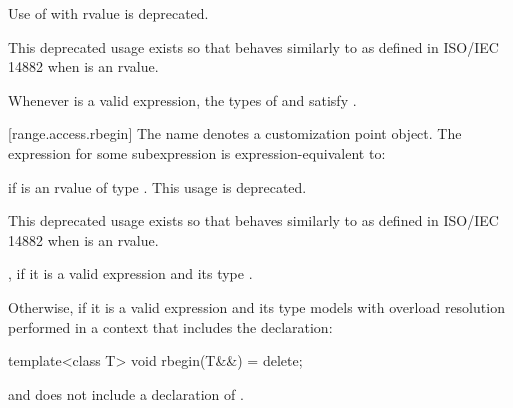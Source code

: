 {{\color{oldclr}
\pnum
Use of  with rvalue  is deprecated.
\begin{note}
This deprecated usage exists so that 
behaves similarly to  as defined in ISO/IEC 14882 when
 is an rvalue.
\end{note}
} %

\pnum
\begin{note}
Whenever  is a valid expression, the
types of  and  satisfy
.
\end{note}

[range.access.rbegin]{}
\pnum
The name  denotes a customization point
object. The expression
 for some subexpression  is expression-equivalent
to:

\begin{itemize}
{\color{oldclr}
\item
   if  is an rvalue of
  type . This usage is deprecated.
  \begin{note}
  This deprecated usage exists so that  behaves similarly
  to  as defined in ISO/IEC 14882 when  is an rvalue.
  \end{note}
} %

\item
   ,
   if it is a valid expression and its
  type   .

{\color{newclr}
\item
  Otherwise,  if it is a valid expression
  and its type  models  with overload resolution
  performed in a context that includes the declaration:
  \begin{codeblock}
  template<class T> void rbegin(T&&) = delete;
  \end{codeblock}
  and does not include a declaration of .
} %


\end{itemize}}
